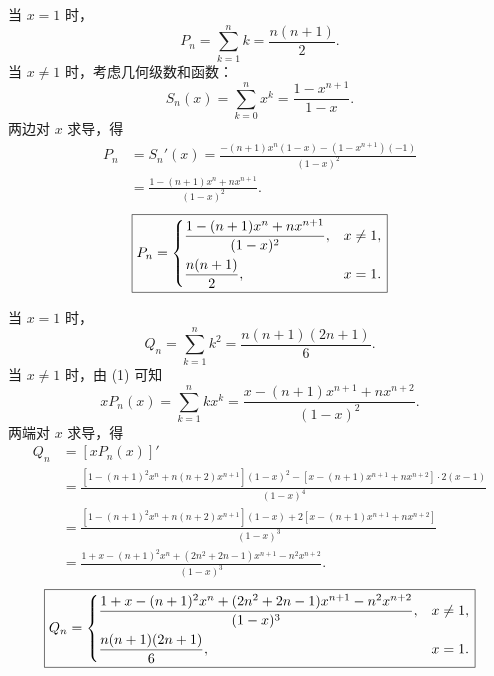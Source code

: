 \begin{solution}

    当 $x = 1$ 时，
    \begin{equation}
        P_n = \sum_{k=1}^n k = \frac{n(n+1)}{2}.
    \end{equation}
    当 $x \neq 1$ 时，考虑几何级数和函数：
    \begin{equation}
        S_n(x) = \sum_{k=0}^n x^k = \frac{1 - x^{n+1}}{1 - x}.
    \end{equation}
    两边对 $x$ 求导，得
    \begin{equation}
        \begin{aligned}
            P_n & = S_n'(x) = \frac{-(n+1)x^n(1 - x) - (1 - x^{n+1})(-1)}{(1 - x)^2} \\
                & = \frac{1 - (n+1)x^n + n x^{n+1}}{(1 - x)^2}.
        \end{aligned}
    \end{equation}
    \begin{equation}
        \boxed{P_n = \begin{dcases} \frac{1 - (n+1)x^n + nx^{n+1}}{(1-x)^2}, & x \neq 1, \\ \frac{n(n+1)}{2}, & x = 1. \end{dcases}}
    \end{equation}


    当 $x = 1$ 时，
    \begin{equation}
        Q_n = \sum_{k=1}^n k^2 = \frac{n(n+1)(2n+1)}{6}.
    \end{equation}
    当 $x \neq 1$ 时，由 (1) 可知
    \begin{equation}
        x P_n(x) = \sum_{k=1}^n k x^k = \frac{x - (n+1)x^{n+1} + nx^{n+2}}{(1 - x)^2}.
    \end{equation}
    两端对 $x$ 求导，得
    \begin{equation}
        \begin{aligned}
            Q_n & = [x P_n(x)]'                                                                                                \\
                & = \frac{[1 - (n+1)^2 x^n + n(n+2)x^{n+1}](1 - x)^2 - [x - (n+1)x^{n+1} + nx^{n+2}]\cdot 2(x - 1)}{(1 - x)^4} \\
                & = \frac{[1 - (n+1)^2 x^n + n(n+2)x^{n+1}](1 - x) + 2[x - (n+1)x^{n+1} + nx^{n+2}]}{(1 - x)^3}                \\
                & = \frac{1 + x - (n+1)^2 x^n + (2n^2 + 2n - 1)x^{n+1} - n^2 x^{n+2}}{(1 - x)^3}.
        \end{aligned}
    \end{equation}
    \begin{equation}
        \boxed{Q_n = \begin{dcases} \frac{1 + x - (n+1)^2 x^n + (2n^2 + 2n - 1)x^{n+1} - n^2 x^{n+2}}{(1-x)^3}, & x \neq 1, \\ \frac{n(n+1)(2n+1)}{6}, & x = 1. \end{dcases}}
    \end{equation}


\end{solution}

